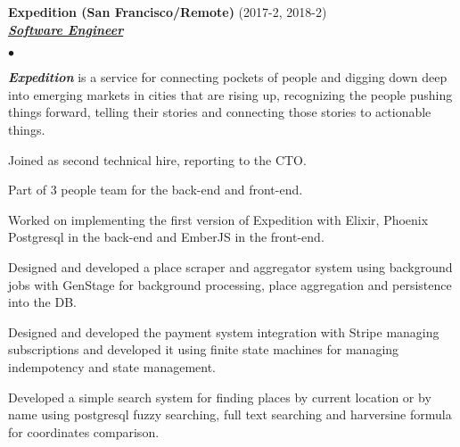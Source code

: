 \documentclass[a4paper]{article}
\newcommand{\employer}[3]{{
  \textbf{#1} (#2)\\ \underline{\textbf{\emph{#3}}}\\ }}
\newenvironment{achievements}{\begin{list}{$\bullet$}{\topsep 0pt \itemsep
  -2pt}}{\vspace*{4pt}\end{list}}
\newcommand{\emphasys}[1]{\textbf{\emph{#1}}}
\begin{document}
  \newpage

  \employer{ Expedition (San Francisco/Remote)}{2017-2, 2018-2}{Software Engineer}
  \begin{achievements}
  \item \emphasys{Expedition} is a service for connecting pockets of people and digging down deep into emerging markets in cities that are rising up, recognizing the people pushing things forward, telling their stories and connecting those stories to actionable things.
  \item Joined as second technical hire, reporting to the CTO.
  \item Part of 3 people team for the back-end and front-end.
  \item Worked on implementing the first version of Expedition with Elixir, Phoenix Postgresql in the back-end and EmberJS in the front-end.
  \item Designed and developed a place scraper and aggregator system using background jobs with GenStage for background processing, place aggregation and persistence into the DB.
  \item Designed and developed the payment system integration with Stripe managing subscriptions and developed it using finite state machines for managing indempotency and state management.
  \item Developed a simple search system for finding places by current location or by name using postgresql fuzzy searching, full text searching and harversine formula for coordinates comparison.
  \end{achievements}
\end{document}
